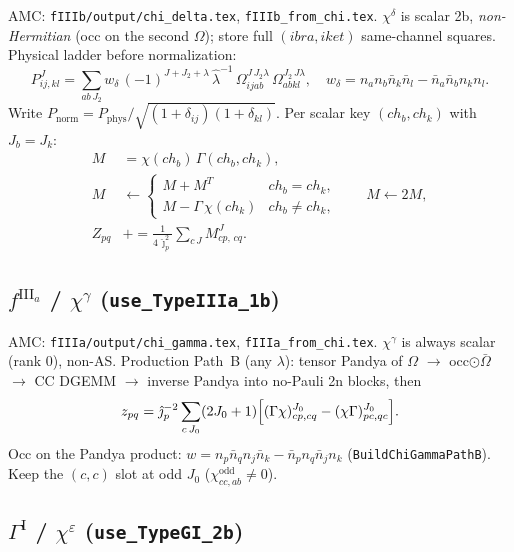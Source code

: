 \documentclass[enabledeprecatedfontcommands]{scrartcl}
\newcommand{\codename}[1]{\texttt{#1}}
\begin{document}
AMC: \codename{fIIIb/output/chi\_delta.tex}, \codename{fIIIb\_from\_chi.tex}.
$\chi^\delta$ is scalar 2b, \emph{non-Hermitian} (occ on the second
$\Omega$); store full $(ibra,iket)$ same-channel squares.
Physical ladder before normalization:
\begin{equation}\label{eq:js-chid}
P^{J}_{ij,kl}
=\sum_{ab\,J_2}
w_\delta\,(-1)^{J+J_2+\lambda}\,\hat\lambda^{-1}\,
\Omega^{J\,J_2\lambda}_{ijab}\,
\Omega^{J_2\,J\lambda}_{abkl},
\quad
w_\delta=n_a n_b\bar n_k\bar n_l-\bar n_a\bar n_b n_k n_l.
\end{equation}
Write $P_{\mathrm{norm}}=P_{\mathrm{phys}}/\sqrt{(1+\delta_{ij})(1+\delta_{kl})}$.
Per scalar key $(ch_b,ch_k)$ with $J_b=J_k$:
\begin{equation}\label{eq:js-fIIIb}
\begin{aligned}
M&=\chi(ch_b)\,\Gamma(ch_b,ch_k),\\
M&\leftarrow
\begin{cases}
M+M^{T} & ch_b=ch_k,\\
M-\Gamma\,\chi(ch_k) & ch_b\neq ch_k,
\end{cases}
\qquad
M\leftarrow 2M,\\
Z_{pq}
&\mathrel{+}=
\frac{1}{4\,\hat\jmath_p^{2}}
\sum_{c\,J}M^{J}_{cp,\,cq}.
\end{aligned}
\end{equation}

\subsection{$f^{\mathrm{III}_a}$ / $\chi^\gamma$
(\codename{use\_TypeIIIa\_1b})}
\label{sec:js-fIIIa}

AMC: \codename{fIIIa/output/chi\_gamma.tex},
\codename{fIIIa\_from\_chi.tex}. $\chi^\gamma$ is always scalar
(rank $0$), non-AS. Production Path~B (any $\lambda$): tensor Pandya of
$\Omega$ $\to$ occ$\odot\bar\Omega$ $\to$ CC DGEMM $\to$ inverse Pandya
into no-Pauli 2n blocks, then
\begin{equation}\label{eq:js-fIIIa}
z_{pq}
=\hat\jmath_p^{-2}
\sum_{c\,J_0}(2J_0+1)
\Bigl[
(\Gamma\chi)^{J_0}_{cp,cq}
-(\chi\Gamma)^{J_0}_{pc,qc}
\Bigr].
\end{equation}
Occ on the Pandya product:
$w=n_p\bar n_q n_j\bar n_k-\bar n_p n_q\bar n_j n_k$
(\codename{BuildChiGammaPathB}). Keep the $(c,c)$ slot at odd $J_0$
($\chi_{cc,ab}^{\mathrm{odd}}\neq0$).

\subsection{$\Gamma^{\mathrm{I}}$ / $\chi^\varepsilon$
(\codename{use\_TypeGI\_2b})}
\label{sec:js-GI}
\end{document}
